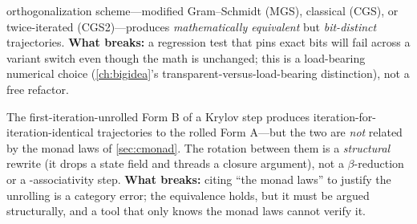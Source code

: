 \begin{description}[style=nextline, leftmargin=0pt, font=\normalfont\itshape]
  orthogonalization scheme---modified Gram--Schmidt (MGS), classical (CGS), or
  twice-iterated (CGS2)---produces \emph{mathematically equivalent} but
  \emph{bit-distinct} trajectories. \textbf{What breaks:} a regression test that pins
  exact bits will fail across a variant switch even though the math is unchanged; this
  is a load-bearing numerical choice (\cref{ch:bigidea}'s transparent-versus-load-bearing
  distinction), not a free refactor.
  \item[Form-A / Form-B equivalence is \emph{not} a monad-law rewrite.] The
  first-iteration-unrolled Form B of a Krylov step produces
  iteration-for-iteration-identical trajectories to the rolled Form A---but the two
  are \emph{not} related by the monad laws of \cref{sec:cmonad}. The rotation between
  them is a \emph{structural} rewrite (it drops a state field and threads a closure
  argument), not a $\beta$-reduction or a \code{>>=}-associativity step.
  \textbf{What breaks:} citing ``the monad laws'' to justify the unrolling is a
  category error; the equivalence holds, but it must be argued structurally, and a
  tool that only knows the monad laws cannot verify it.
\end{description}

